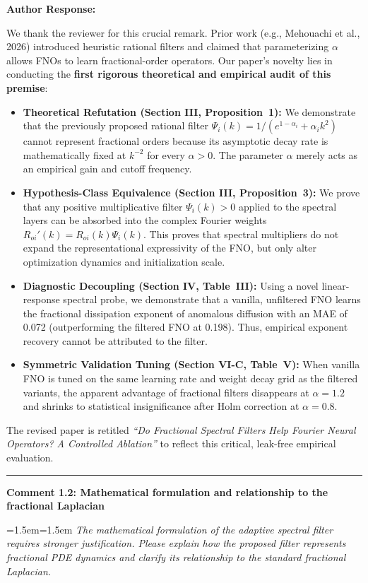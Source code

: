 \documentclass[11pt,a4paper]{article}
\newcommand{\revcomment}[2]{%
  \vspace{3mm}\par\noindent
  \textbf{\color{navyblue}#1}\par\vspace{1.5mm}
  \begingroup
  \leftskip=1.5em\rightskip=1.5em
  \small\itshape\color{commentgray}
  #2\par
  \endgroup
  \vspace{2mm}
}
\newenvironment{authorresponse}{%
  \vspace{1mm}\par\noindent
  \textbf{\color{navyblue}Author Response:}\par\vspace{1.5mm}
}{%
  \vspace{3mm}\par\noindent\rule{\textwidth}{0.3pt}\vspace{2mm}
}
\begin{document}
\begin{authorresponse}
We thank the reviewer for this crucial remark. Prior work (e.g., Mehouachi et al., 2026) introduced heuristic rational filters and claimed that parameterizing $\alpha$ allows FNOs to learn fractional-order operators. Our paper's novelty lies in conducting the \textbf{first rigorous theoretical and empirical audit of this premise}:

\begin{itemize}
  \item \textbf{Theoretical Refutation (Section III, Proposition~1):} We demonstrate that the previously proposed rational filter $\Psi_i(k) = 1/(e^{1-\alpha_i} + \alpha_i k^2)$ cannot represent fractional orders because its asymptotic decay rate is mathematically fixed at $k^{-2}$ for every $\alpha > 0$. The parameter $\alpha$ merely acts as an empirical gain and cutoff frequency.
  \item \textbf{Hypothesis-Class Equivalence (Section III, Proposition~3):} We prove that any positive multiplicative filter $\Psi_i(k) > 0$ applied to the spectral layers can be absorbed into the complex Fourier weights $R_{oi}'(k) = R_{oi}(k)\Psi_i(k)$. This proves that spectral multipliers do not expand the representational expressivity of the FNO, but only alter optimization dynamics and initialization scale.
  \item \textbf{Diagnostic Decoupling (Section IV, Table~III):} Using a novel linear-response spectral probe, we demonstrate that a vanilla, unfiltered FNO learns the fractional dissipation exponent of anomalous diffusion with an MAE of 0.072 (outperforming the filtered FNO at 0.198). Thus, empirical exponent recovery cannot be attributed to the filter.
  \item \textbf{Symmetric Validation Tuning (Section VI-C, Table~V):} When vanilla FNO is tuned on the same learning rate and weight decay grid as the filtered variants, the apparent advantage of fractional filters disappears at $\alpha=1.2$ and shrinks to statistical insignificance after Holm correction at $\alpha=0.8$.
\end{itemize}
The revised paper is retitled \textit{``Do Fractional Spectral Filters Help Fourier Neural Operators? A Controlled Ablation''} to reflect this critical, leak-free empirical evaluation.
\end{authorresponse}

\revcomment{Comment 1.2: Mathematical formulation and relationship to the fractional Laplacian}{The mathematical formulation of the adaptive spectral filter requires stronger justification. Please explain how the proposed filter represents fractional PDE dynamics and clarify its relationship to the standard fractional Laplacian.}
\end{document}

